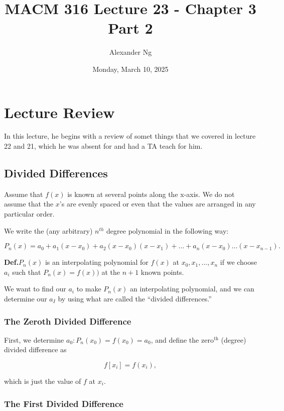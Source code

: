 \documentclass[12pt]{article}
\newcommand{\defn}{\textbf{Def.}\xspace}
\begin{document}
\title{MACM 316 Lecture 23 - Chapter 3 Part 2}
\author{Alexander Ng}
\date{Monday, March 10, 2025}

\maketitle

\section*{Lecture Review}

In this lecture, he begins with a review of somet things that we covered in
lecture 22 and 21, which he was absent for and had a TA teach for him.

\subsection{Divided Differences}

Assume that $f(x)$ is known at several points along the x-axis. We do not assume
that the $x$'s are evenly spaced or even that the values are arranged in any
particular order.

We write the (any arbitrary) $n^{th}$ degree polynomial in the following way:

\[
  P_n(x) = a_0 + a_1 (x-x_0) + a_2 (x-x_0) (x-x_1) + \dots + a_n (x-x_0) \dots (x-x_{n-1})
.\]

\defn $P_n(x)$ is an interpolating polynomial for $f(x)$ at $x_0, x_1, \dots, x_n$
if we choose $a_i$ such that $P_n(x) = f(x))$ at the $n+1$ known points.

We want to find our $a_i$ to make $P_n(x)$ an interpolating polynomial, and we
can determine our $a_I$ by using what are called the \enquote{divided
differences.}

\subsubsection{The Zeroth Divided Difference}

First, we determine $a_0: P_n(x_0) = f(x_0) = a_0$, and define the
$\text{zero}^{\text{th}}$ (degree) divided difference as

\[
  f[x_i] = f(x_i)
,\]

\noindent
which is just the value of $f$ at $x_i$.

\subsubsection{The First Divided Difference}
\end{document}
